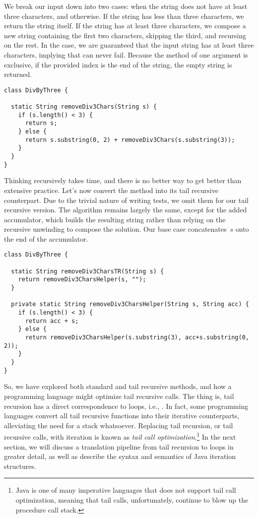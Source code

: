 We break our input down into two cases: when the string does not have at least three characters, and otherwise. 
If the string has less than three characters, we return the string itself. 
If the string has at least three characters, we compose a new string containing the first two characters, skipping the third, and recursing on the rest. 
In the  case, we are guaranteed that the input string has at least three characters, implying that  can never fail. 
Because the  method of one argument is exclusive, if the provided index is the end of the string, the empty string is returned.

\begin{lstlisting}[language=MyJava]
class DivByThree {

  static String removeDiv3Chars(String s) {
    if (s.length() < 3) {
      return s;
    } else {
      return s.substring(0, 2) + removeDiv3Chars(s.substring(3));
    }
  }
}
\end{lstlisting}

Thinking recursively takes time, and there is no better way to get better than extensive practice. Let's now convert the method into its tail recursive counterpart. 
Due to the trivial nature of writing tests, we omit them for our tail recursive version. 
The algorithm remains largely the same, except for the added accumulator, which builds the resulting string rather than relying on the recursive unwinding to compose the solution. 
Our base case concatenates~$s$ onto the end of the accumulator.

\begin{lstlisting}[language=MyJava]
class DivByThree {

  static String removeDiv3CharsTR(String s) {
    return removeDiv3CharsHelper(s, "");
  }

  private static String removeDiv3CharsHelper(String s, String acc) {
    if (s.length() < 3) {
      return acc + s;
    } else {
      return removeDiv3CharsHelper(s.substring(3), acc+s.substring(0, 2));
    }
  }
}
\end{lstlisting}

So, we have explored both standard and tail recursive methods, and how a programming language might optimize tail recursive calls. 
The thing is, tail recursion has a direct correspondence to loops, i.e., . 
In fact, some programming languages convert all tail recursive functions into their iterative counterparts, alleviating the need for a stack whatsoever.
Replacing tail recursion, or tail recursive calls, with iteration is known as \emph{tail call optimization}.\footnote{Java is one of many imperative languages that does not support tail call optimization, meaning that tail calls, unfortunately, continue to blow up the procedure call stack.} 
In the next section, we will discuss a translation pipeline from tail recursion to loops in greater detail, as well as describe the syntax and semantics of Java iteration structures.

